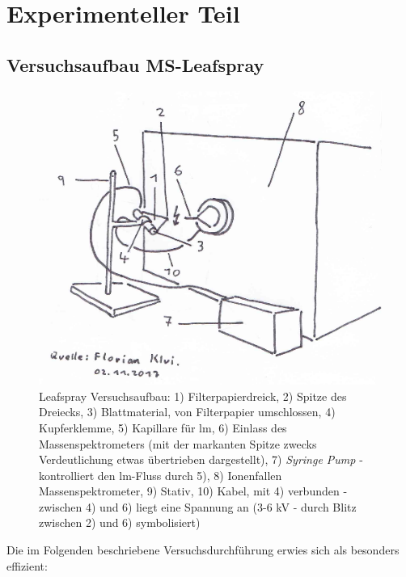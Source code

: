 \documentclass[12pt,a4paper]{article}
\begin{document}
\section{Experimenteller Teil}

\subsection{Versuchsaufbau MS-Leafspray} \label{sec:Versuchsaufbau}


\begin{figure}[!hbtp]
  \centering
  \includegraphics[scale=0.5]{figures/Kapitel4/VWA_MSLeafspray_Versuchsaufbau.png}
  \caption[MS Leafspray Versuchsaufbau, Quelle: Autor]{Leafspray Versuchsaufbau: 1) Filterpapierdreick, 2) Spitze des Dreiecks, 3) Blattmaterial, von Filterpapier umschlossen, 4) Kupferklemme, 5) Kapillare für \gls{lm}, 6) Einlass des Massenspektrometers (mit der markanten Spitze zwecks Verdeutlichung etwas übertrieben dargestellt), 7) \textit{Syringe Pump} - kontrolliert den \gls{lm}-Fluss durch 5), 8) Ionenfallen Massenspektrometer, 9) Stativ, 10) Kabel, mit 4) verbunden - zwischen 4) und 6) liegt eine Spannung   an (3-6 kV - durch Blitz zwischen 2) und 6) symbolisiert)}
  \label{fig:LeafsprayVersuchsaufbau}
\end{figure}

Die im Folgenden beschriebene Versuchsdurchführung erwies sich als besonders effizient:
\end{document}
